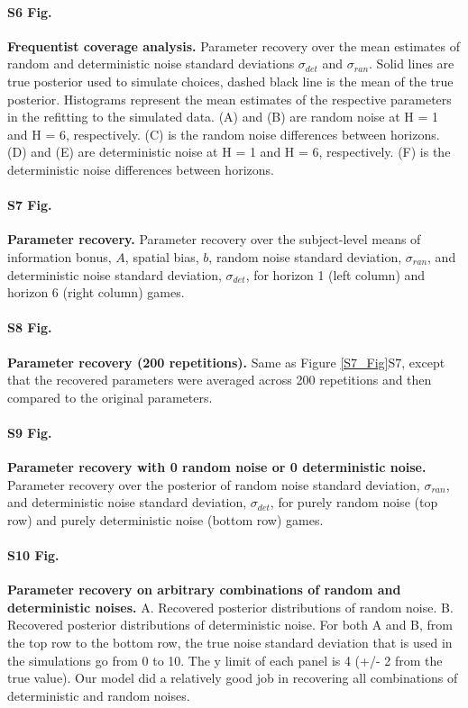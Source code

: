 \documentclass[12pt]{article}
\begin{document}
{\paragraph*{S6 Fig.}
\label{S6_Fig}
{\bf Frequentist coverage analysis.}
Parameter recovery over the mean estimates of random and deterministic noise standard deviations $\sigma_{det}$ and $\sigma_{ran}$. Solid lines are true posterior used to simulate choices, dashed black line is the mean of the true posterior. Histograms represent the mean estimates of the respective parameters in the refitting to the simulated data. (A) and (B) are random noise at H = 1 and H = 6, respectively. (C) is the random noise differences between horizons. (D) and (E) are deterministic noise at H = 1 and H = 6, respectively. (F) is the deterministic noise differences between horizons.

\paragraph*{S7 Fig.}
\label{S7_Fig}
{\bf Parameter recovery.}
Parameter recovery over the subject-level means of information bonus, $A$, spatial bias, $b$, random noise standard deviation, $\sigma_{ran}$, and deterministic noise standard deviation, $\sigma_{det}$, for horizon 1 (left column) and horizon 6 (right column) games.

\paragraph*{S8 Fig.}
\label{S8_Fig}
{\bf Parameter recovery (200 repetitions).}
Same as Figure \ref{S7_Fig}{S7}, except that the recovered parameters were averaged across 200 repetitions and then compared to the original parameters.

\paragraph*{S9 Fig.}
\label{S9_Fig}
{\bf Parameter recovery with 0 random noise or 0 deterministic noise.} Parameter recovery over the posterior of random noise standard deviation, $\sigma_{ran}$, and deterministic noise standard deviation, $\sigma_{det}$, for purely random noise (top row) and purely deterministic noise (bottom row) games. 
	
\paragraph*{S10 Fig.}
\label{S10_Fig}
{\bf Parameter recovery on arbitrary combinations of random and deterministic noises.} A. Recovered posterior distributions of random noise. B. Recovered posterior distributions of deterministic noise. For both A and B, from the top row to the bottom row, the true noise standard deviation that is used in the simulations go from 0 to 10. The y limit of each panel is 4 (+/- 2 from the true value). Our model did a relatively good job in recovering all combinations of deterministic and random noises.

}
\end{document}
